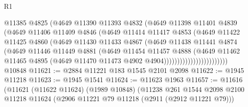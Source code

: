 \begin{lexlean}{R1}
\begin{coremodule}
                              @11385
                              @4825
                              (@4649
                                @11390
                                @11393
                                @4832
                                (@4649
                                  @11398
                                  @11401
                                  @4839
                                  (@4649
                                    @11406
                                    @11409
                                    @4846
                                    (@4649
                                      @11414
                                      @11417
                                      @4853
                                      (@4649
                                        @11422
                                        @11425
                                        @4860
                                        (@4649
                                          @11430
                                          @11433
                                          @4867
                                          (@4649
                                            @11438
                                            @11441
                                            @4874
                                            (@4649
                                              @11446
                                              @11449
                                              @4881
                                              (@4649
                                                @11454
                                                @11457
                                                @4888
                                                (@4649
                                                  @11462
                                                  @11465
                                                  @4895
                                                  (@4649
                                                    @11470
                                                    @11473
                                                    @4902
                                                    @4904))))))))))))))))))))))))
    @10848
@11621 := @2884 @11221 @183 @1545 @2101 @2098
@11622 := @1945 @11218
@11623 := @1945 @1541
@11624 := @11623 @1963
@11657 := @11616
    (@11621
      (@11622 @11624)
      (@1989 @10848)
      (@11238
        @261
        @1544
        @2098
        @2100
        @11218
        @11624
        (@2906 @11221 @79 @11218 (@2911 (@2912 @11221 @79)))

\end{coremodule}
\end{lexlean}
